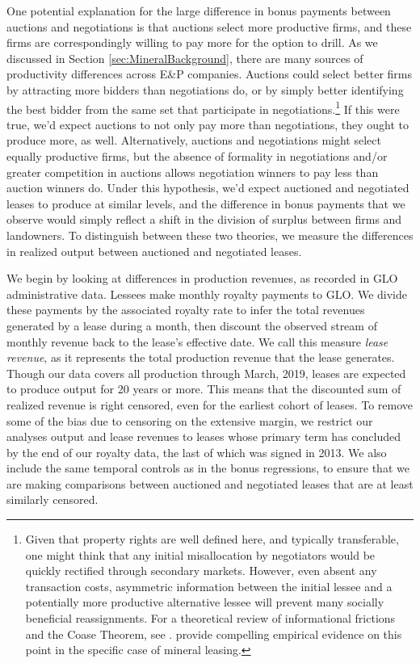 \documentclass[12pt]{article}
\begin{document}
One potential explanation for the large difference in bonus payments between auctions and negotiations is that auctions select more productive firms, and these firms are correspondingly willing to pay more for the option to drill. As we discussed in Section \ref{sec:MineralBackground}, there are many sources of productivity differences across E\&P companies. Auctions could select better firms by attracting more bidders than negotiations do, or by simply better identifying the best bidder from the same set that participate in negotiations.\footnote{Given that property rights are well defined here, and typically transferable, one might think that any initial misallocation by negotiators would be quickly rectified through secondary markets. However, even absent any transaction costs, asymmetric information between the initial lessee and a potentially more productive alternative lessee will prevent many socially beneficial reassignments. For a theoretical review of informational frictions and the Coase Theorem, see \citet{Farrell1987-df}. \cite{BrehmLewis} provide compelling empirical evidence on this point in the specific case of mineral leasing.} If this were true, we'd expect auctions to not only pay more than negotiations, they ought to produce more, as well.  Alternatively, auctions and negotiations might select equally productive firms, but the absence of formality in negotiations and/or greater competition in auctions allows negotiation winners to pay less than auction winners do.  Under this hypothesis, we'd expect auctioned and negotiated leases to produce at similar levels, and the difference in bonus payments that we observe would simply reflect a shift in the division of surplus between firms and landowners. To distinguish between these two theories, we measure the differences in realized output between auctioned and negotiated leases. 

We begin by looking at differences in production revenues, as recorded in GLO administrative data. Lessees make monthly royalty payments to GLO. We divide these payments by the associated royalty rate to infer the total revenues generated by a lease during a month, then discount the observed stream of monthly revenue back to the lease's effective date.  We call this measure \textit{lease revenue}, as it represents the total production revenue that the lease generates.  Though our data covers all production through March, 2019, leases are expected to produce output for 20 years or more. This means that the discounted sum of realized revenue is right censored, even for the earliest cohort of leases. To remove some of the bias due to censoring on the extensive margin, we restrict our analyses output and lease revenues to leases whose primary term has concluded by the end of our royalty data, the last of which was signed in 2013. We also include the same temporal controls as in the bonus regressions, to ensure that we are making comparisons between auctioned and negotiated leases that are at least similarly censored.  
\end{document}
